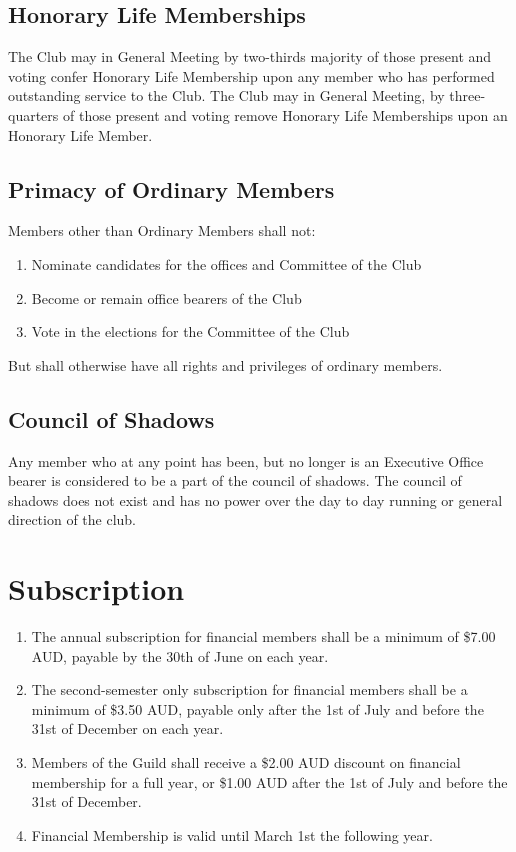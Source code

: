\documentclass[10pt,a4paper]{report}
\begin{document}
		\subsection{Honorary Life Memberships}
			The Club may in General Meeting by two-thirds majority of those present and voting confer Honorary Life Membership upon any member who has performed outstanding service to the Club.
            The Club may in General Meeting, by three-quarters of those present and voting remove Honorary Life Memberships upon an Honorary Life Member.
		\subsection{Primacy of Ordinary Members}
		Members other than Ordinary Members shall not:
		\begin{enumerate}[label=\alph*]
			\item Nominate candidates for the offices and Committee of the Club
			\item Become or remain office bearers of the Club
			\item Vote in the elections for the Committee of the Club
		\end{enumerate}
		But shall otherwise have all rights and privileges of ordinary members.
		\subsection{Council of Shadows}
		Any member who at any point has been, but no longer is an Executive Office bearer is considered to be a part of the council of shadows. The council of shadows does not exist and has no power over the day to day running or general direction of the club.
	\section{Subscription}

		\begin{enumerate}[label=\alph*]
			\item The annual subscription for financial members shall be a minimum of \$7.00 AUD, payable by the 30th of June on each year.

			\item The second-semester only subscription for financial members shall be a minimum of \$3.50 AUD, payable only after the 1st of July and before the 31st of December on each year.

			\item Members of the Guild shall receive a \$2.00 AUD discount on financial membership for a full year, or \$1.00 AUD after the 1st of July and before the 31st of December.

			\item Financial Membership is valid until March 1st the following year.
		\end{enumerate}
\end{document}
